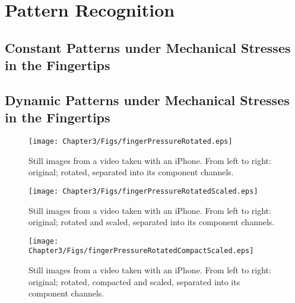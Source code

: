 \chapter{Pattern Recognition}

\ifpdf
    \graphicspath{{Chapter3/Figs/Raster/}{Chapter3/Figs/PDF/}{Chapter3/Figs/}}
\else
    \graphicspath{{Chapter3/Figs/Vector/}{Chapter3/Figs/}}
\fi

\section{Constant Patterns under Mechanical Stresses in the Fingertips}\label{sec:ConstantPatterns}

\section{Dynamic Patterns under Mechanical Stresses in the Fingertips}\label{sec:DynamicPatterns}

\begin{figure}[h!]
  \caption{Still images from a video taken with an iPhone. From left to right: original; rotated, separated into its component channels.}
  \label{fig:pressureCandidates1}
  \centering
    \texttt{[image: Chapter3/Figs/fingerPressureRotated.eps]}
\end{figure}
\begin{figure}[h!]
  \caption{Still images from a video taken with an iPhone. From left to right: original; rotated and scaled, separated into its component channels.}
  \label{fig:pressureCandidates2}
  \centering
    \texttt{[image: Chapter3/Figs/fingerPressureRotatedScaled.eps]}
\end{figure}
\begin{figure}[h!]
  \caption{Still images from a video taken with an iPhone. From left to right: original; rotated, compacted and scaled, separated into its component channels.}
  \label{fig:pressureCandidate3}
  \centering
    \texttt{[image: Chapter3/Figs/fingerPressureRotatedCompactScaled.eps]}
\end{figure}

